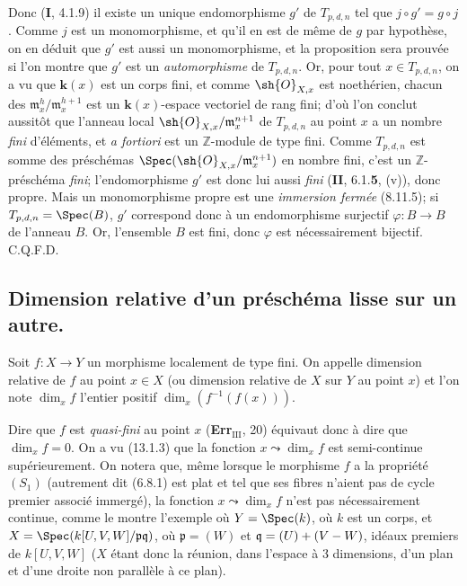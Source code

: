 Donc (\textbf{I}, 4.1.9) il existe un unique endomorphisme $g'$ de $T_{p,d,n}$ tel que $j\circ g'=g\circ j$. Comme $j$ est un monomorphisme, et qu'il en est de même de $g$ par hypothèse, on en déduit que $g'$ est aussi un monomorphisme, et la proposition sera prouvée si l'on montre que $g'$ est un \emph{automorphisme} de $T_{p,d,n}$. Or, pour tout $x\in T_{p,d,n}$, on a vu que $\boldsymbol{k}(x)$ est un corps fini, et comme $\sh{O}_{X,x}$ est noethérien, chacun des $\mathfrak m_x^h/\mathfrak m_x^{h+1}$ est un $\boldsymbol{k}(x)$-espace vectoriel de rang fini; d'où l'on conclut aussitôt que l'anneau local $\sh{O}_{X,x}/\mathfrak m_x^{n+1}$ de $T_{p,d,n}$ au point $x$ a un nombre \emph{fini} d'éléments, et \emph{a fortiori} est un $\mathbb{Z}$-module de type fini. Comme $T_{p,d,n}$ est somme des préschémas $\Spec(\sh{O}_{X,x}/\mathfrak m_x^{n+1})$ en nombre fini, c'est un $\mathbb{Z}$-préschéma \emph{fini}; l'endomorphisme $g'$ est donc lui aussi \emph{fini} (\textbf{II}, 6.1.\textbf{5}, (v)), donc propre. Mais un monomorphisme propre est une \emph{immersion fermée} (8.11.5); si $T_{p,d,n}=\Spec(B)$, $g'$ correspond donc à un endomorphisme surjectif $\varphi:B\to B$ de l'anneau $B$. Or, l'ensemble $B$ est fini, donc $\varphi$ est nécessairement bijectif. C.Q.F.D.

\subsection{Dimension relative d'un préschéma lisse sur un autre.}

\begin{definition}[17.10.1]
Soit $f:X\to Y$ un morphisme localement de type fini. On appelle dimension relative de $f$ au point $x\in X$ (ou dimension relative de $X$ sur $Y$ au point $x$) et l'on note $\dim_x f$ l'entier positif $\dim_x(f^{-1}(f(x)))$.
\end{definition}

Dire que $f$ est \emph{quasi-fini} au point $x$ (\textbf{Err}$_{\mathrm{III}}$, 20) équivaut donc à dire que $\dim_x f=0$. On a vu (13.1.3) que la fonction $x\leadsto\dim_x f$ est semi-continue supérieurement. On notera que, même lorsque le morphisme $f$ a la propriété $(S_1)$ (autrement dit (6.8.1) est plat et tel que ses fibres n'aient pas de cycle premier associé immergé), la fonction $x\leadsto\dim_x f$ n'est pas nécessairement continue, comme le montre l'exemple où $Y=\Spec(k)$, où $k$ est un corps, et $X=\Spec(k[U,V,W]/\mathfrak p\mathfrak q)$, où $\mathfrak p=(W)$ et $\mathfrak q=(U)+(V- W)$, idéaux premiers de $k[U,V,W]$ ($X$ étant donc la réunion, dans l'espace à 3 dimensions, d'un plan et d'une droite non parallèle à ce plan).

